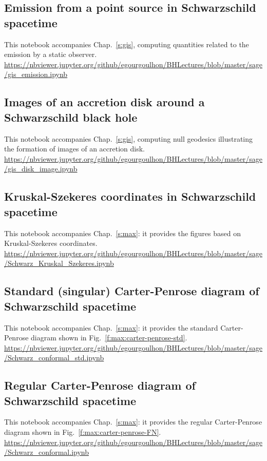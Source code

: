 \subsection{Emission from a point source in Schwarzschild spacetime} \label{s:sam:gis_emission}
%
This notebook accompanies Chap.~\ref{s:gis}, computing quantities related to the
emission by a static observer.\\[1ex]
{\footnotesize
\url{https://nbviewer.jupyter.org/github/egourgoulhon/BHLectures/blob/master/sage/gis_emission.ipynb}
}

\subsection{Images of an accretion disk around a Schwarzschild black hole} \label{s:sam:gis_disk_image}
%
This notebook accompanies Chap.~\ref{s:gis}, computing null geodesics illustrating the formation of images of an accretion disk.\\[1ex]
{\footnotesize
\url{https://nbviewer.jupyter.org/github/egourgoulhon/BHLectures/blob/master/sage/gis_disk_image.ipynb}
}

\subsection{Kruskal-Szekeres coordinates in Schwarzschild spacetime} \label{s:sam:Schwarz_Kruskal_Szekeres}

This notebook accompanies Chap.~\ref{s:max}: it provides the figures based on
Kruskal-Szekeres coordinates.\\[1ex]
{\footnotesize
\url{https://nbviewer.jupyter.org/github/egourgoulhon/BHLectures/blob/master/sage/Schwarz_Kruskal_Szekeres.ipynb}
}

\subsection{Standard (singular) Carter-Penrose diagram of Schwarzschild spacetime}
\label{s:sam:Schwarz_conformal_std}
This notebook accompanies Chap.~\ref{s:max}: it provides the standard
Carter-Penrose diagram shown in Fig.~\ref{f:max:carter-penrose-std}.\\[1ex]
{\footnotesize
\url{https://nbviewer.jupyter.org/github/egourgoulhon/BHLectures/blob/master/sage/Schwarz_conformal_std.ipynb}
}

\subsection{Regular Carter-Penrose diagram of Schwarzschild spacetime}
\label{s:sam:Schwarz_conformal}
This notebook accompanies Chap.~\ref{s:max}: it provides the regular
Carter-Penrose diagram shown in Fig.~\ref{f:max:carter-penrose-FN}.\\[1ex]
{\footnotesize
\url{https://nbviewer.jupyter.org/github/egourgoulhon/BHLectures/blob/master/sage/Schwarz_conformal.ipynb}
}


